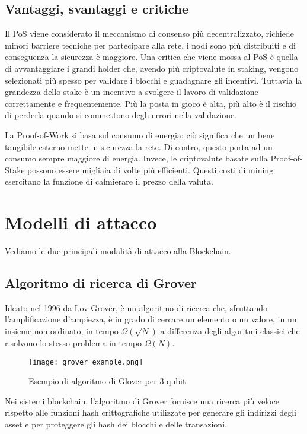 \subsection{Vantaggi, svantaggi e critiche}
Il PoS viene considerato il meccanismo di consenso più decentralizzato, richiede minori barriere tecniche per partecipare alla rete, i nodi sono più distribuiti e di conseguenza la sicurezza è maggiore. Una critica che viene mossa al PoS è quella di avvantaggiare i grandi holder che, avendo più criptovalute in staking, vengono selezionati più spesso per validare i blocchi e guadagnare gli incentivi. Tuttavia la grandezza dello stake è un incentivo a svolgere il lavoro di validazione correttamente e frequentemente. Più la posta in gioco è alta, più alto è il rischio di perderla quando si commettono degli errori nella validazione.

La Proof-of-Work si basa sul consumo di energia: ciò significa che un bene tangibile esterno mette in sicurezza la rete. Di contro, questo porta ad un consumo sempre maggiore di energia. Invece, le criptovalute basate sulla Proof-of-Stake possono essere migliaia di volte più efficienti. Questi costi di mining esercitano la funzione di calmierare il prezzo della valuta.

\section{Modelli di attacco}
Vediamo le due principali modalità di attacco alla Blockchain.

\subsection{Algoritmo di ricerca di Grover}
Ideato nel 1996 da Lov Grover, è un algoritmo di ricerca che, sfruttando l'amplificazione d'ampiezza, è in grado di cercare un elemento o un valore, in un insieme non ordinato, in tempo \(\Omega\left(\sqrt{N}\right)\) a differenza degli algoritmi classici che risolvono lo stesso problema in tempo \(\Omega\left(N\right)\).

\begin{figure}[h]
  \centering
  \texttt{[image: grover\_example.png]}
  \caption{Esempio di algoritmo di Glover per 3 qubit}
  \label{fig:grover_example}
\end{figure}

Nei sistemi blockchain, l'algoritmo di Grover fornisce una ricerca più veloce rispetto alle funzioni hash crittografiche utilizzate per generare gli indirizzi degli asset e per proteggere gli hash dei blocchi e delle transazioni.

